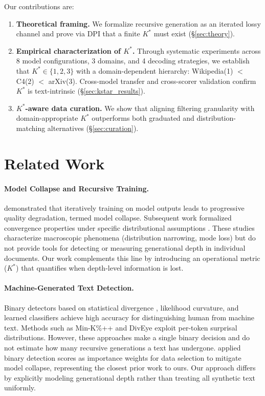 \documentclass[11pt,a4paper]{article}
\newcommand{\Kstar}{K^{*}}
\begin{document}
Our contributions are:
\begin{enumerate}[leftmargin=*, itemsep=2pt]
    \item \textbf{Theoretical framing.} We formalize recursive generation as an iterated lossy channel and prove via DPI that a finite $\Kstar$ must exist (\S\ref{sec:theory}).
    \item \textbf{Empirical characterization of $\Kstar$.} Through systematic experiments across 8 model configurations, 3 domains, and 4 decoding strategies, we establish that $\Kstar \in \{1,2,3\}$ with a domain-dependent hierarchy: Wikipedia(1) $<$ C4(2) $<$ arXiv(3). Cross-model transfer and cross-scorer validation confirm $\Kstar$ is text-intrinsic (\S\ref{sec:kstar_results}).
    \item \textbf{$\Kstar$-aware data curation.} We show that aligning filtering granularity with domain-appropriate $\Kstar$ outperforms both graduated and distribution-matching alternatives (\S\ref{sec:curation}).
\end{enumerate}

\section{Related Work}
\label{sec:related}

\paragraph{Model Collapse and Recursive Training.}
\citet{shumailov2024collapse} demonstrated that iteratively training on model outputs leads to progressive quality degradation, termed model collapse. Subsequent work formalized convergence properties under specific distributional assumptions \citep{alemohammad2024selfconsuming, dohmatob2024tale}. These studies characterize macroscopic phenomena (distribution narrowing, mode loss) but do not provide tools for detecting or measuring generational depth in individual documents. Our work complements this line by introducing an operational metric ($\Kstar$) that quantifies when depth-level information is lost.

\paragraph{Machine-Generated Text Detection.}
Binary detectors based on statistical divergence \citep{mitchell2023detectgpt}, likelihood curvature, and learned classifiers achieve high accuracy for distinguishing human from machine text. Methods such as Min-K\%++ and DivEye exploit per-token surprisal distributions. However, these approaches make a single binary decision and do not estimate how many recursive generations a text has undergone. \citet{drayson2025synthetic} applied binary detection scores as importance weights for data selection to mitigate model collapse, representing the closest prior work to ours. Our approach differs by explicitly modeling generational depth rather than treating all synthetic text uniformly.
\end{document}
